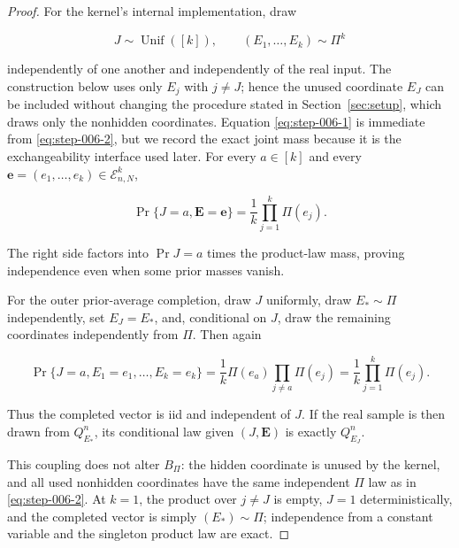 \begin{proof}

For the kernel's internal implementation, draw

\[
J\sim\operatorname{Unif}([k]),
\qquad
(E_1,\ldots,E_k)\sim\Pi^k
\tag{2}\label{eq:step-006-2}
\]

independently of one another and independently of the real input. The construction below uses only \(E_j\) with \(j\ne J\); hence the unused coordinate \(E_J\) can be included without changing the procedure stated in Section~\ref{sec:setup}, which draws only the nonhidden coordinates. Equation \eqref{eq:step-006-1} is immediate from \eqref{eq:step-006-2}, but we record the exact joint mass because it is the exchangeability interface used later. For every \(a\in[k]\) and every \(\mathbf e=(e_1,\ldots,e_k)\in\mathcal E_{n,N}^k\),

\[
\Pr\{J=a,\mathbf E=\mathbf e\}
=\frac1k\prod_{j=1}^k\Pi(e_j).
\tag{3}\label{eq:step-006-3}
\]

The right side factors into \(\Pr{J=a}\) times the product-law mass, proving independence even when some prior masses vanish.

For the outer prior-average completion, draw \(J\) uniformly, draw \(E_* \sim \Pi\) independently, set \(E_J=E_*\), and, conditional on \(J\), draw the remaining coordinates independently from \(\Pi\). Then again

\[
\Pr\{J=a,E_1=e_1,\ldots,E_k=e_k\}
=\frac1k\Pi(e_a)\prod_{j\ne a}\Pi(e_j)
=\frac1k\prod_{j=1}^k\Pi(e_j).
\tag{4}\label{eq:step-006-4}
\]

Thus the completed vector is iid and independent of \(J\). If the real sample is then drawn from \(Q_{E_*}^n\), its conditional law given \((J,\mathbf E)\) is exactly \(Q_{E_J}^n\).

This coupling does not alter \(B_\Pi\): the hidden coordinate is unused by the kernel, and all used nonhidden coordinates have the same independent \(\Pi\) law as in \eqref{eq:step-006-2}. At \(k=1\), the product over \(j\ne J\) is empty, \(J=1\) deterministically, and the completed vector is simply \((E_*) \sim \Pi\); independence from a constant variable and the singleton product law are exact.

\end{proof}


